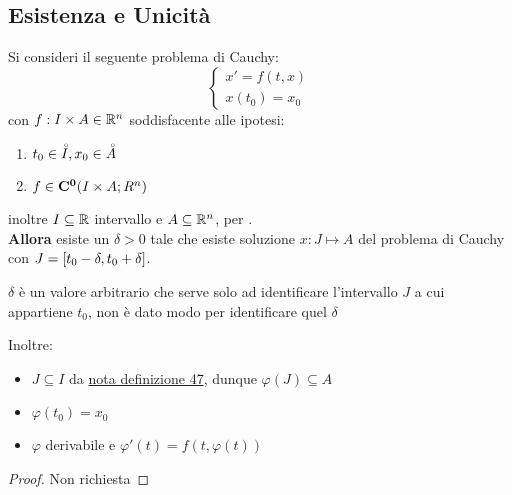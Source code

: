 \subsection{Esistenza e Unicità}
\begin{proposition}
	\label{teo:peano}
	Si consideri il seguente problema di Cauchy:
	$$\left\{\begin{matrix} x'=f(t,x)\\x(t_0)=x_0\end{matrix}\right.$$
	con $f:I\times A\in \mathbb{R}^n$ soddisfacente alle ipotesi:
	\begin{enumerate}
		\item $t_0\in \accentset{\circ}{I}, x_0\in \accentset{\circ}{A}$
		\item $f\in \mathbf{C^{0}}(I\times A;R^n)$
	\end{enumerate}
	inoltre $I\subseteq \mathbb{R}$ intervallo e $A\subseteq \mathbb{R}^n$, per .\\
	\textbf{Allora} esiste un $\delta>0$ tale che esiste soluzione $x:J\mapsto A$ del problema di Cauchy con $J=\left[t_0-\delta,t_0+\delta\right]$.
	\begin{note}
		$\delta$ è un valore arbitrario che serve solo ad identificare l'intervallo $J$ a cui appartiene $t_0$, non è dato modo per identificare quel $\delta$
	\end{note}
	Inoltre:
	\begin{itemize}
		\item $J\subseteq I$ da \hyperlink{note:diff_eq_sol_definit_set}{nota definizione 47}, dunque $\varphi(J)\subseteq A$
		\item $\varphi(t_0)=x_0$
		\item $\varphi$ derivabile e $\varphi'(t)=f(t,\varphi(t))$
	\end{itemize}
	\begin{proof}
		Non richiesta
	\end{proof}
\end{proposition}
